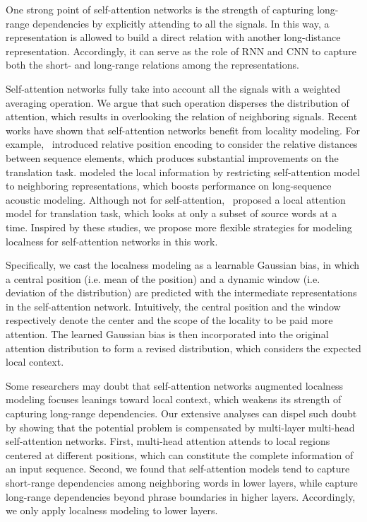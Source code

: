 \documentclass[11pt,a4paper]{article}
\begin{document}
One strong point of self-attention networks is the strength of capturing long-range dependencies by explicitly attending to all the signals. In this way, a representation is allowed to build a direct relation with another long-distance representation. Accordingly, it can serve as the role of RNN and CNN to capture both the short- and long-range relations among the representations.


Self-attention networks fully take into account all the signals with a weighted averaging operation. We argue that such operation disperses the distribution of attention, which results in overlooking the relation of neighboring signals. Recent works have shown that self-attention networks benefit from locality modeling. For example,~ introduced relative position encoding to consider the relative distances between sequence elements, which produces substantial improvements on the translation task. 
 modeled the local information by restricting self-attention model to neighboring representations, which boosts performance on long-sequence acoustic modeling. Although not for self-attention,~ proposed a local attention model for translation task, which looks at only a subset of source words at a time. Inspired by these studies, we propose more flexible strategies for modeling localness for self-attention networks in this work.





Specifically, we cast the localness modeling as a learnable Gaussian bias, in which a central position (i.e. mean of the position) and a dynamic window (i.e. deviation of the distribution) are predicted with the intermediate representations in the self-attention network. Intuitively, the central position and the window respectively denote the center and the scope of the locality to be paid more attention. The learned Gaussian bias is then incorporated into the original attention distribution to form a revised distribution, which considers the expected local context.

Some researchers may doubt that self-attention networks augmented localness modeling focuses leanings toward local context, which weakens its strength of capturing long-range dependencies. Our extensive analyses can dispel such doubt by showing that the potential problem is compensated by multi-layer multi-head self-attention networks. First,  multi-head attention attends to local regions centered at different positions, which can constitute the complete information of an input sequence. Second, we found that self-attention models tend to capture short-range dependencies among neighboring words in lower layers, while capture long-range dependencies beyond phrase boundaries in higher layers. Accordingly, we only apply localness modeling to lower layers.
\end{document}
